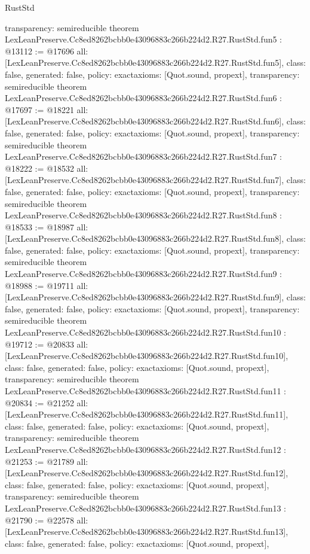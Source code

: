 \begin{lexlean}{RustStd}
\begin{coremodule}
{  transparency: semireducible
}
theorem LexLeanPreserve.Cc8ed8262bcbb0e43096883c266b224d2.R27.RustStd.fun5 : @13112 := @17696 {
  all: [LexLeanPreserve.Cc8ed8262bcbb0e43096883c266b224d2.R27.RustStd.fun5],
  class: false,
  generated: false,
  policy: exact{axioms: [Quot.sound, propext]},
  transparency: semireducible
}
theorem LexLeanPreserve.Cc8ed8262bcbb0e43096883c266b224d2.R27.RustStd.fun6 : @17697 := @18221 {
  all: [LexLeanPreserve.Cc8ed8262bcbb0e43096883c266b224d2.R27.RustStd.fun6],
  class: false,
  generated: false,
  policy: exact{axioms: [Quot.sound, propext]},
  transparency: semireducible
}
theorem LexLeanPreserve.Cc8ed8262bcbb0e43096883c266b224d2.R27.RustStd.fun7 : @18222 := @18532 {
  all: [LexLeanPreserve.Cc8ed8262bcbb0e43096883c266b224d2.R27.RustStd.fun7],
  class: false,
  generated: false,
  policy: exact{axioms: [Quot.sound, propext]},
  transparency: semireducible
}
theorem LexLeanPreserve.Cc8ed8262bcbb0e43096883c266b224d2.R27.RustStd.fun8 : @18533 := @18987 {
  all: [LexLeanPreserve.Cc8ed8262bcbb0e43096883c266b224d2.R27.RustStd.fun8],
  class: false,
  generated: false,
  policy: exact{axioms: [Quot.sound, propext]},
  transparency: semireducible
}
theorem LexLeanPreserve.Cc8ed8262bcbb0e43096883c266b224d2.R27.RustStd.fun9 : @18988 := @19711 {
  all: [LexLeanPreserve.Cc8ed8262bcbb0e43096883c266b224d2.R27.RustStd.fun9],
  class: false,
  generated: false,
  policy: exact{axioms: [Quot.sound, propext]},
  transparency: semireducible
}
theorem LexLeanPreserve.Cc8ed8262bcbb0e43096883c266b224d2.R27.RustStd.fun10 : @19712 := @20833 {
  all: [LexLeanPreserve.Cc8ed8262bcbb0e43096883c266b224d2.R27.RustStd.fun10],
  class: false,
  generated: false,
  policy: exact{axioms: [Quot.sound, propext]},
  transparency: semireducible
}
theorem LexLeanPreserve.Cc8ed8262bcbb0e43096883c266b224d2.R27.RustStd.fun11 : @20834 := @21252 {
  all: [LexLeanPreserve.Cc8ed8262bcbb0e43096883c266b224d2.R27.RustStd.fun11],
  class: false,
  generated: false,
  policy: exact{axioms: [Quot.sound, propext]},
  transparency: semireducible
}
theorem LexLeanPreserve.Cc8ed8262bcbb0e43096883c266b224d2.R27.RustStd.fun12 : @21253 := @21789 {
  all: [LexLeanPreserve.Cc8ed8262bcbb0e43096883c266b224d2.R27.RustStd.fun12],
  class: false,
  generated: false,
  policy: exact{axioms: [Quot.sound, propext]},
  transparency: semireducible
}
theorem LexLeanPreserve.Cc8ed8262bcbb0e43096883c266b224d2.R27.RustStd.fun13 : @21790 := @22578 {
  all: [LexLeanPreserve.Cc8ed8262bcbb0e43096883c266b224d2.R27.RustStd.fun13],
  class: false,
  generated: false,
  policy: exact{axioms: [Quot.sound, propext]},
}
\end{coremodule}
\end{lexlean}
